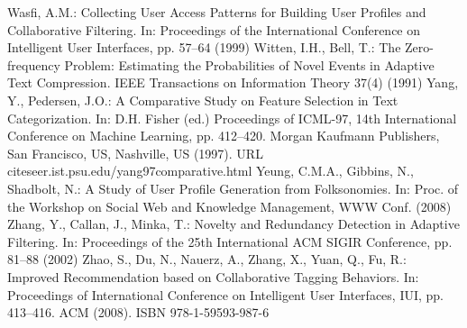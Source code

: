 \begin{thebibliography}{99}
Wasfi, A.M.: Collecting User Access Patterns for Building User Profiles and Collaborative Filtering. In: Proceedings of the International Conference on Intelligent User Interfaces, pp. 57–64 (1999)
Witten, I.H., Bell, T.: The Zero-frequency Problem: Estimating the Probabilities of Novel Events in Adaptive Text Compression. IEEE Transactions on Information Theory 37(4) (1991)
Yang, Y., Pedersen, J.O.: A Comparative Study on Feature Selection in Text Categorization. In: D.H. Fisher (ed.) Proceedings of ICML-97, 14th International Conference on Machine Learning, pp. 412–420. Morgan Kaufmann Publishers, San Francisco, US, Nashville, US (1997). URL citeseer.ist.psu.edu/yang97comparative.html
Yeung, C.M.A., Gibbins, N., Shadbolt, N.: A Study of User Profile Generation from Folksonomies. In: Proc. of the Workshop on Social Web and Knowledge Management, WWW Conf. (2008)
Zhang, Y., Callan, J., Minka, T.: Novelty and Redundancy Detection in Adaptive Filtering. In: Proceedings of the 25th International ACM SIGIR Conference, pp. 81–88 (2002)
Zhao, S., Du, N., Nauerz, A., Zhang, X., Yuan, Q., Fu, R.: Improved Recommendation based on Collaborative Tagging Behaviors. In: Proceedings of International Conference on Intelligent User Interfaces, IUI, pp. 413–416. ACM (2008). ISBN 978-1-59593-987-6
\end{thebibliography}